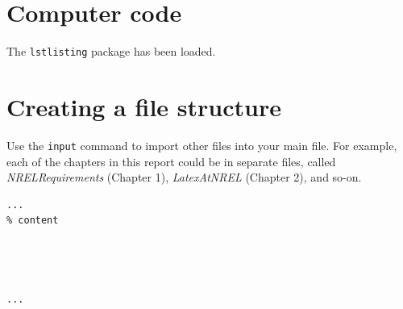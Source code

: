 \section{Computer code}
The \texttt{lstlisting} package has been loaded.

\section{Creating a file structure}
\label{sec:FileStructure}
Use the \texttt{input} command to import other files into your main file. For example, each of the chapters in this report could be in separate files, called \emph{NRELRequirements} (Chapter 1), \emph{LatexAtNREL} (Chapter 2), and so-on. 

\begin{verbatim}
...
% content




...
\end{verbatim}
